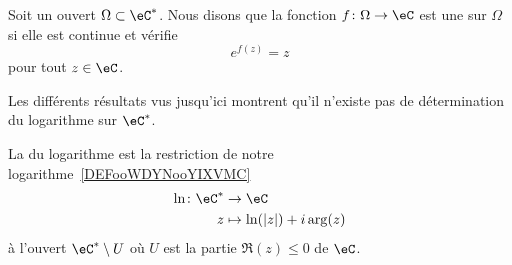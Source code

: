 \begin{definition}
    Soit un ouvert \( \Omega\subset \eC^*\). Nous disons que la fonction \( f\colon \Omega\to \eC\) est une  sur \( \Omega\) si elle est continue et vérifie
    \begin{equation}
        e^{f(z)}=z
    \end{equation}
    pour tout \( z\in \eC\).
\end{definition}

Les différents résultats vus jusqu'ici montrent qu'il n'existe pas de détermination du logarithme sur \( \eC^*\).

\begin{definition}
    La  du logarithme est la restriction de notre logarithme~\ref{DEFooWDYNooYIXVMC}
    \begin{equation}
        \begin{aligned}
            \ln\colon \eC^*&\to \eC \\
            z&\mapsto \ln(| z |)+i\arg(z)
        \end{aligned}
    \end{equation}
    à l'ouvert \( \eC^*\setminus U\) où \( U\) est la partie \( \Re(z)\leq 0\) de \( \eC\).
\end{definition}

